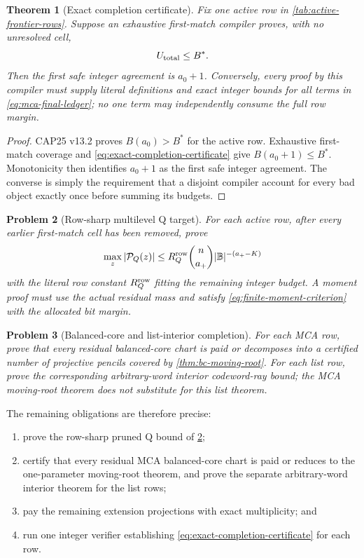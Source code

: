 \documentclass[11pt,a4paper]{amsart}
\numberwithin{equation}{section}
\newtheorem{theorem}{Theorem}[section]
\newtheorem{problem}[theorem]{Problem}
\theoremstyle{remark}
\begin{document}
\begin{theorem}[Exact completion certificate]\label{thm:exact-completion-certificate}
Fix one active row in \cref{tab:active-frontier-rows}.  Suppose an exhaustive first-match compiler proves, with no unresolved cell,
\begin{equation}
 U_{\rm total}\le B^*.\label{eq:exact-completion-certificate}
\end{equation}
Then the first safe integer agreement is $a_0+1$.  Conversely, every proof by this compiler must supply literal definitions and exact integer bounds for all terms in \eqref{eq:mca-final-ledger}; no one term may independently consume the full row margin.
\end{theorem}
\begin{proof}
CAP25 v13.2 proves $B(a_0)>B^*$ for the active row.  Exhaustive first-match coverage and \eqref{eq:exact-completion-certificate} give $B(a_0+1)\le B^*$.  Monotonicity then identifies $a_0+1$ as the first safe integer agreement.  The converse is simply the requirement that a disjoint compiler account for every bad object exactly once before summing its budgets.
\end{proof}

\begin{problem}[Row-sharp multilevel Q target]\label{prob:row-sharp-q}
For each active row, after every earlier first-match cell has been removed, prove
\[
 \max_z|\mathcal P_Q(z)|\le R_Q^{\rm row}\binom n{a_+}|\mathbb B|^{-(a_+-K)}
\]
with the literal row constant $R_Q^{\rm row}$ fitting the remaining integer budget.  A moment proof must use the actual residual mass and satisfy \eqref{eq:finite-moment-criterion} with the allocated bit margin.
\end{problem}

\begin{problem}[Balanced-core and list-interior completion]\label{prob:saturated-bc}
For each MCA row, prove that every residual balanced-core chart is paid or decomposes into a certified number of projective pencils covered by \cref{thm:bc-moving-root}.  For each list row, prove the corresponding arbitrary-word interior codeword-ray bound; the MCA moving-root theorem does not substitute for this list theorem.
\end{problem}

The remaining obligations are therefore precise:
\begin{enumerate}[label=\textup{(F\arabic*)},leftmargin=*]
\item prove the row-sharp pruned Q bound of \cref{prob:row-sharp-q};
\item certify that every residual MCA balanced-core chart is paid or reduces to the one-parameter moving-root theorem, and prove the separate arbitrary-word interior theorem for the list rows;
\item pay the remaining extension projections with exact multiplicity; and
\item run one integer verifier establishing \eqref{eq:exact-completion-certificate} for each row.
\end{enumerate}
\end{document}

